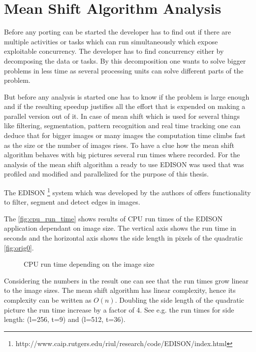\chapter{Mean Shift Algorithm Analysis} %
\label{ch:algorithm_analysis}
Before any porting can be started the developer has to find out if
there are multiple activities or tasks which can run simultaneously
which expose exploitable concurrency. The developer has to find
concurrency either by decomposing the data or tasks. By this
decomposition one wants to solve bigger problems in less time as
several processing units can solve different parts of the problem.

But before any analysis is started one has to know if the problem is
large enough and if the resulting speedup justifies all the effort
that is expended on making a parallel version out of it. In case of
mean shift which is used for several things like filtering,
segmentation, pattern recognition and real time tracking one can
deduce that for bigger images or many images the computation time
climbs fast as the size or the number of images rises. To have a clue
how the mean shift algorithm behaves with big pictures several run
times where recorded.  For the analysis of the mean shift algorithm a
ready to use \gls{EDISON} was used that was profiled and modified and
parallelized for the purpose of this thesis.

The \gls{EDISON}
\footnote{http://www.caip.rutgers.edu/riul/research/code/EDISON/index.html}
system which was developed by the authors
\citeauthor{citeulike:462300} of \citep{citeulike:462300} offers
functionality to filter, segment and detect edges in images.
 
The \autoref{fig:cpu_run_time} shows results of \gls{CPU} run times of
the \gls{EDISON} application dependant on image size. The vertical
axis shows the run time in seconds and the horizontal axis shows the
side length in pixels of the quadratic \autoref{fig:orig0}.
\begin{figure}[ht]
  \centering
  \caption{CPU run time depending on the image size}\label{fig:cpu_run_time}%
\end{figure}
Considering the numbers in the result one can see that the run times
grow linear to the image sizes. The mean shift algorithm has linear
complexity, hence its complexity can be written as $O(n)$. Doubling
the side length of the quadratic picture the run time increase by a
factor of 4. See e.g.  the run times for side length: (l=256, t=9) and
(l=512, t=36).
    
